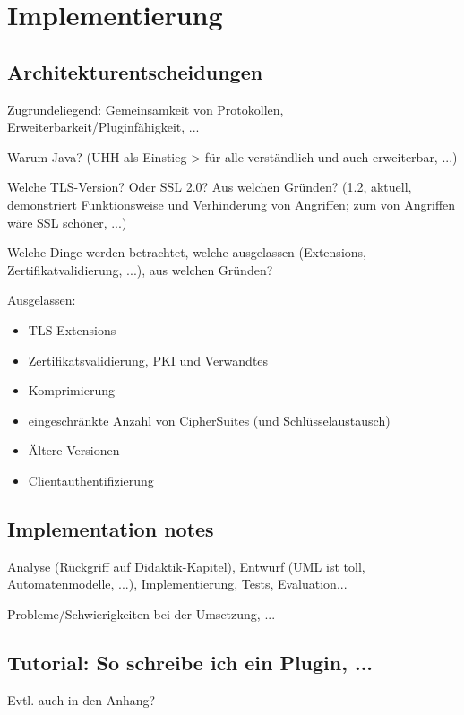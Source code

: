 \chapter{Implementierung}

\section{Architekturentscheidungen}

Zugrundeliegend: Gemeinsamkeit von Protokollen, Erweiterbarkeit/Pluginfähigkeit, ...

Warum Java? (UHH als Einstieg-> für alle verständlich und auch erweiterbar, ...)

Welche TLS-Version? Oder SSL 2.0? Aus welchen Gründen? (1.2, aktuell, demonstriert Funktionsweise und Verhinderung von Angriffen; zum  von Angriffen wäre SSL schöner, ...)

Welche Dinge werden betrachtet, welche ausgelassen (Extensions, Zertifikatvalidierung, ...), aus welchen Gründen?

Ausgelassen:
\begin{itemize}
\item TLS-Extensions
\item Zertifikatsvalidierung, PKI und Verwandtes
\item Komprimierung
\item eingeschränkte Anzahl von CipherSuites (und Schlüsselaustausch)
\item Ältere Versionen
\item Clientauthentifizierung
\end{itemize}

\section{Implementation notes}

Analyse (Rückgriff auf Didaktik-Kapitel), Entwurf (UML ist toll, Automatenmodelle, ...), Implementierung, Tests, Evaluation...

Probleme/Schwierigkeiten bei der Umsetzung, ...

\section{Tutorial: So schreibe ich ein Plugin, ...}

Evtl. auch in den Anhang?